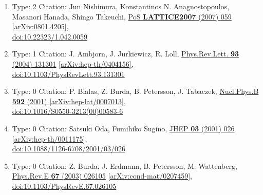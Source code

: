 \documentclass[a4paper,10pt]{article}
\begin{document}
\begin{enumerate}
\begin{enumerate}
  \item Type: 2 Citation: Jun Nishimura, Konstantinos N. Anagnostopoulos, Masanori Hanada, Shingo Takeuchi, \href{https://www.doi.org/10.22323/1.042.0059}{PoS {\bf LATTICE2007} (2007) 059}  \href{https://arxiv.org/abs/0801.4205}{[arXiv:0801.4205]},\\\href{https://www.doi.org/10.22323/1.042.0059}{doi:10.22323/1.042.0059}
  \item Type: 1 Citation: J. Ambjorn, J. Jurkiewicz, R. Loll, \href{https://www.doi.org/10.1103/PhysRevLett.93.131301}{Phys.Rev.Lett. {\bf 93} (2004) 131301}  \href{https://arxiv.org/abs/hep-th/0404156}{[arXiv:hep-th/0404156]},\\\href{https://www.doi.org/10.1103/PhysRevLett.93.131301}{doi:10.1103/PhysRevLett.93.131301}
  \item Type: 0 Citation: P. Bialas, Z. Burda, B. Petersson, J. Tabaczek, \href{https://www.doi.org/10.1016/S0550-3213(00)00583-6}{Nucl.Phys.B {\bf 592} (2001) }  \href{https://arxiv.org/abs/hep-lat/0007013}{[arXiv:hep-lat/0007013]},\\\href{https://www.doi.org/10.1016/S0550-3213(00)00583-6}{doi:10.1016/S0550-3213(00)00583-6}
  \item Type: 0 Citation: Satsuki Oda, Fumihiko Sugino, \href{https://www.doi.org/10.1088/1126-6708/2001/03/026}{JHEP {\bf 03} (2001) 026}  \href{https://arxiv.org/abs/hep-th/0011175}{[arXiv:hep-th/0011175]},\\\href{https://www.doi.org/10.1088/1126-6708/2001/03/026}{doi:10.1088/1126-6708/2001/03/026}
  \item Type: 0 Citation: Z. Burda, J. Erdmann, B. Petersson, M. Wattenberg, \href{https://www.doi.org/10.1103/PhysRevE.67.026105}{Phys.Rev.E {\bf 67} (2003) 026105}  \href{https://arxiv.org/abs/cond-mat/0207459}{[arXiv:cond-mat/0207459]},\\\href{https://www.doi.org/10.1103/PhysRevE.67.026105}{doi:10.1103/PhysRevE.67.026105}

\end{enumerate}
\end{enumerate}
\end{document}

